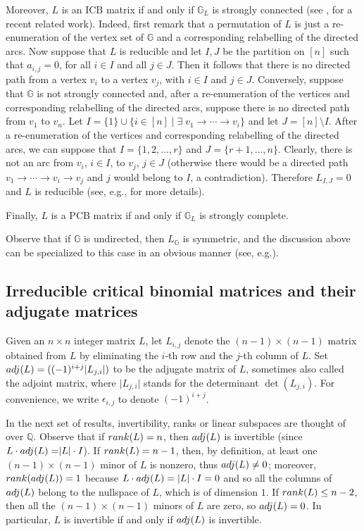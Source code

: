 \documentclass[10pt]{amsart}
\newcommand{\eg}{e.g.}
\newcommand{\mbq}{\mbox{$\mathbb{Q}$}}
\newcommand{\mbg}{\mbox{$\mathbb{G}$}}
\newcommand{\icb}{\mbox{$\mathrm{ICB}$}}
\newcommand{\pcb}{\mbox{$\mathrm{PCB}$}}
\newcommand{\I}{\mbox{${\rm I}$}}
\newcommand{\rank}{\mbox{${\rm rank}$}}
\newcommand{\adj}{\mbox{${\rm adj}$}}
\theoremstyle{definition}
\theoremstyle{remark}
\begin{document}
Moreover, $L$ is an $\icb$ matrix if and only if $\mbg_L$ is strongly
connected (see \cite{cv}, for a recent related work). Indeed, first
remark that a permutation of $L$ is just a re-enumeration of the
vertex set of $\mbg$ and a corresponding relabelling of the directed
arcs. Now suppose that $L$ is reducible and let $I,J$ be the partition
on $[n]$ such that $a_{i,j}=0$, for all $i\in I$ and all $j\in
J$. Then it follows that there is no directed path from a vertex $v_i$
to a vertex $v_j$, with $i\in I$ and $j\in J$. Conversely, suppose
that $\mbg$ is not strongly connected and, after a re-enumeration of
the vertices and corresponding relabelling of the directed arcs,
suppose there is no directed path from $v_1$ to $v_n$. Let
$I=\{1\}\cup\{i\in [n]\mid \exists \; v_1\to\cdots\to v_i\}$ and let
$J=[n]\setminus I$. After a re-enumeration of the vertices and
corresponding relabelling of the directed arcs, we can suppose that
$I=\{1,2,\ldots ,r\}$ and $J=\{r+1,\ldots ,n\}$. Clearly, there is not
an arc from $v_i$, $i\in I$, to $v_j$, $j\in J$ (otherwise there would
be a directed path $v_1\to\cdots\to v_i\to v_j$ and $j$ would belong
to $I$, a contradiction). Therefore $L_{I,J}=0$ and $L$ is reducible
(see, \eg \cite[Theorem~3.2.1]{br}, for more details).

Finally, $L$ is a $\pcb$ matrix if and only if $\mbg_L$ is strongly
complete.

Observe that if $\mbg$ is undirected, then $L_{\mathbb{G}}$ is
symmetric, and the discussion above can be specialized to this case in
an obvious manner (see, \eg \cite{ms}).

\vspace{-.25em}

\subsection{Irreducible critical binomial matrices and their adjugate 
matrices}\label{ibm-adj} %

 Given an $n\times n$ integer matrix $L$, let $L_{i,j}$
denote the $(n-1)\times (n-1)$ matrix obtained from $L$ by eliminating
the $i$-th row and the $j$-th column of $L$. Set $\adj(L)=
((-1)^{i+j}\lvert L_{j,i}\rvert)$ to be the adjugate matrix of $L$,
sometimes also called the adjoint matrix, where $\lvert L_{j,i}\rvert$
stands for the determinant $\det(L_{j,i})$. For convenience, we write
$\epsilon_{i,j}$ to denote $(-1)^{i+j}$.

In the next set of results, invertibility, ranks or linear subspaces
are thought of over $\mbq$. Observe that if $\rank(L)=n$, then
$\adj(L)$ is invertible (since $L\cdot \adj(L)=\rvert
L\rvert\cdot\I$). If $\rank(L)=n-1$, then, by definition, at least
one $(n-1)\times (n-1)$ minor of $L$ is nonzero, thus $\adj(L)\neq 0$;
moreover, $\rank(\adj(L))=1$ because $L\cdot \adj(L)=\lvert
L\rvert\cdot \I=0$ and so all the columns of $\adj(L)$ belong to the
nullspace of $L$, which is of dimension $1$. If $\rank(L)\leq n-2$,
then all the $(n-1)\times (n-1)$ minors of $L$ are zero, so
$\adj(L)=0$. In particular, $L$ is invertible if and only if $\adj(L)$
is invertible.
\end{document}

